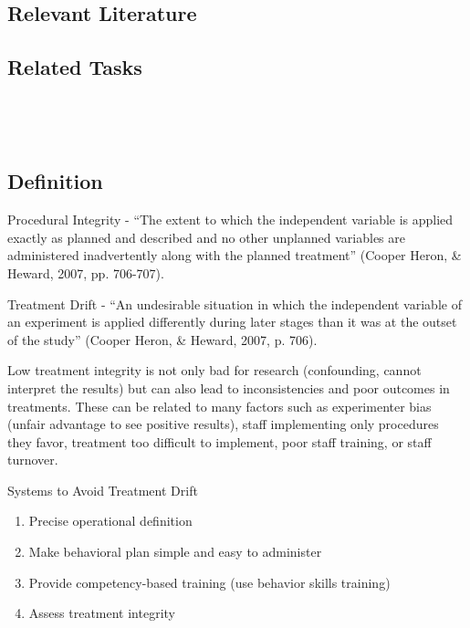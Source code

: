 \subsection{Relevant Literature}
\begin{refsection}
\nocite{bailey2013ethics,
        bac2014professional}
\printbibliography[heading=none]
\end{refsection}
%
\subsection{Related Tasks}
\fourgSeven{}\\
\fourkNine{}\\
%
\clearpage \section[\fourkFive{}]{\fourkFive{}%
              }
\subsection{Definition}
Procedural Integrity - ``The extent to which the independent variable is applied exactly as planned and described and no other unplanned variables are administered inadvertently along with the planned treatment'' (Cooper Heron, \& Heward, 2007, pp. 706-707).

Treatment Drift - ``An undesirable situation in which the independent variable of an experiment is applied differently during later stages than it was at the outset of the study'' (Cooper Heron, \& Heward, 2007, p. 706).

Low treatment integrity is not only bad for research (confounding, cannot interpret the results) but can also lead to inconsistencies and poor outcomes in treatments.  These can be related to many factors such as experimenter bias (unfair advantage to see positive results), staff implementing only procedures they favor, treatment too difficult to implement, poor staff training, or staff turnover.

Systems to Avoid Treatment Drift
\begin{enumerate}
\item Precise operational definition
\item Make behavioral plan simple and easy to administer
\item Provide competency-based training (use behavior skills training)
\item Assess treatment integrity
\end{enumerate}

